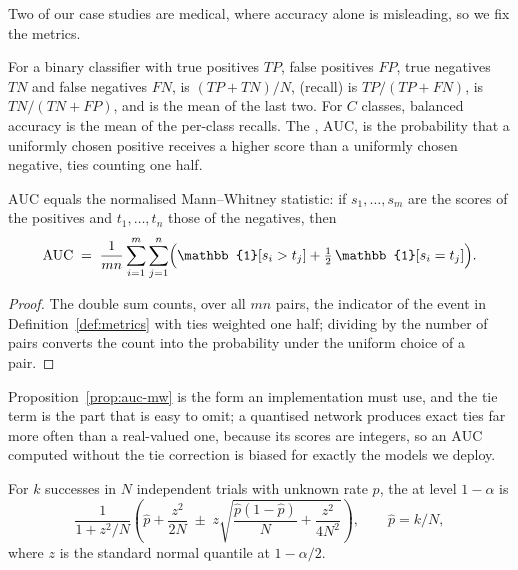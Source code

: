 Two of our case studies are medical, where accuracy alone is misleading, so we fix
the metrics.

\begin{definition}
\label{def:metrics}
For a binary classifier with true positives $\mathit{TP}$, false positives
$\mathit{FP}$, true negatives $\mathit{TN}$ and false negatives $\mathit{FN}$,
 is $(\mathit{TP}+\mathit{TN})/N$,  (recall) is
$\mathit{TP}/(\mathit{TP}+\mathit{FN})$,  is
$\mathit{TN}/(\mathit{TN}+\mathit{FP})$, and  is the mean of
the last two. For $C$ classes, balanced accuracy is the mean of the per-class
recalls. The , $\mathrm{AUC}$,
is the probability that a uniformly chosen positive receives a higher score than a
uniformly chosen negative, ties counting one half.
\end{definition}

\begin{proposition}
\label{prop:auc-mw}
$\mathrm{AUC}$ equals the normalised Mann--Whitney statistic: if $s_1,\dots,s_m$
are the scores of the positives and $t_1,\dots,t_n$ those of the negatives, then
\[
  \mathrm{AUC} \;=\; \frac{1}{mn}\sum_{i=1}^{m}\sum_{j=1}^{n}
  \Bigl(\mathbb{1}[s_i > t_j] + \tfrac12\,\mathbb{1}[s_i = t_j]\Bigr).
\]
\end{proposition}

\begin{proof}
The double sum counts, over all $mn$ pairs, the indicator of the event in
Definition~\ref{def:metrics} with ties weighted one half; dividing by the number
of pairs converts the count into the probability under the uniform choice of a
pair.
\end{proof}

Proposition~\ref{prop:auc-mw} is the form an implementation must use, and the tie
term is the part that is easy to omit; a quantised network produces exact ties far
more often than a real-valued one, because its scores are integers, so an
$\mathrm{AUC}$ computed without the tie correction is biased for exactly the models
we deploy.

\begin{definition}
\label{def:wilson}
For $k$ successes in $N$ independent trials with unknown rate $p$, the
 at level $1-\alpha$ is
\[
  \frac{1}{1+z^2/N}\left(\widehat{p} + \frac{z^2}{2N}
  \;\pm\; z\sqrt{\frac{\widehat{p}(1-\widehat{p})}{N} + \frac{z^2}{4N^2}}\right),
  \qquad \widehat{p} = k/N,
\]
where $z$ is the standard normal quantile at $1-\alpha/2$.
\end{definition}

